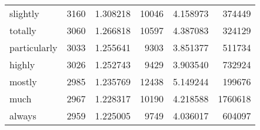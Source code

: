 \begin{table}[ht]
\begin{tabular}{lrrrrr}
slightly & {\cellcolor[HTML]{F3F9FC}} \color[HTML]{000000} 3160 & {\cellcolor[HTML]{F3F9FC}} \color[HTML]{000000} 1.308218 & {\cellcolor[HTML]{F5FAFC}} \color[HTML]{000000} 10046 & {\cellcolor[HTML]{F5FAFC}} \color[HTML]{000000} 4.158973 & {\cellcolor[HTML]{F4FAFC}} \color[HTML]{000000} 374449 \\
totally & {\cellcolor[HTML]{F6FBFC}} \color[HTML]{000000} 3060 & {\cellcolor[HTML]{F6FBFC}} \color[HTML]{000000} 1.266818 & {\cellcolor[HTML]{F3F9FB}} \color[HTML]{000000} 10597 & {\cellcolor[HTML]{F3F9FB}} \color[HTML]{000000} 4.387083 & {\cellcolor[HTML]{F5FAFC}} \color[HTML]{000000} 324129 \\
particularly & {\cellcolor[HTML]{F6FBFD}} \color[HTML]{000000} 3033 & {\cellcolor[HTML]{F6FBFD}} \color[HTML]{000000} 1.255641 & {\cellcolor[HTML]{F7FCFD}} \color[HTML]{000000} 9303 & {\cellcolor[HTML]{F7FCFD}} \color[HTML]{000000} 3.851377 & {\cellcolor[HTML]{F1F8FB}} \color[HTML]{000000} 511734 \\
highly & {\cellcolor[HTML]{F6FBFD}} \color[HTML]{000000} 3026 & {\cellcolor[HTML]{F6FBFD}} \color[HTML]{000000} 1.252743 & {\cellcolor[HTML]{F7FCFD}} \color[HTML]{000000} 9429 & {\cellcolor[HTML]{F7FCFD}} \color[HTML]{000000} 3.903540 & {\cellcolor[HTML]{ECF4F9}} \color[HTML]{000000} 732924 \\
mostly & {\cellcolor[HTML]{F7FCFD}} \color[HTML]{000000} 2985 & {\cellcolor[HTML]{F7FCFD}} \color[HTML]{000000} 1.235769 & {\cellcolor[HTML]{ECF4F9}} \color[HTML]{000000} 12438 & {\cellcolor[HTML]{ECF4F9}} \color[HTML]{000000} 5.149244 & {\cellcolor[HTML]{F7FCFD}} \color[HTML]{000000} 199676 \\
much & {\cellcolor[HTML]{F7FCFD}} \color[HTML]{000000} 2967 & {\cellcolor[HTML]{F7FCFD}} \color[HTML]{000000} 1.228317 & {\cellcolor[HTML]{F4FAFC}} \color[HTML]{000000} 10190 & {\cellcolor[HTML]{F4FAFC}} \color[HTML]{000000} 4.218588 & {\cellcolor[HTML]{D3E2EF}} \color[HTML]{000000} 1760618 \\
always & {\cellcolor[HTML]{F7FCFD}} \color[HTML]{000000} 2959 & {\cellcolor[HTML]{F7FCFD}} \color[HTML]{000000} 1.225005 & {\cellcolor[HTML]{F6FBFC}} \color[HTML]{000000} 9749 & {\cellcolor[HTML]{F6FBFC}} \color[HTML]{000000} 4.036017 & {\cellcolor[HTML]{EFF6FA}} \color[HTML]{000000} 604097 \\
\bottomrule
\end{tabular}
\end{table}
